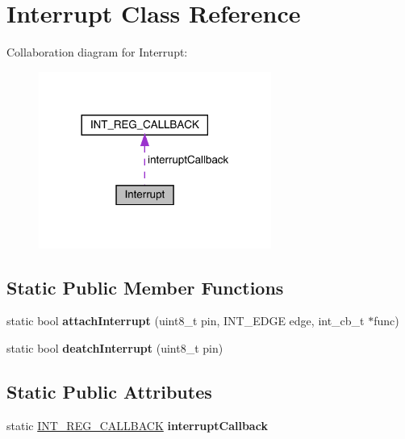 \hypertarget{classInterrupt}{}\section{Interrupt Class Reference}
\label{classInterrupt}


Collaboration diagram for Interrupt\+:\nopagebreak
\begin{figure}[H]
\begin{center}
\leavevmode
\includegraphics[width=216pt]{classInterrupt__coll__graph}
\end{center}
\end{figure}
\subsection*{Static Public Member Functions}
\begin{DoxyCompactItemize}
\item 
\mbox{\label{classInterrupt_a00ff3f6de1e03971a6883b7cb72577e4}} 
static bool {\bfseries attach\+Interrupt} (uint8\+\_\+t pin, I\+N\+T\+\_\+\+E\+D\+GE edge, int\+\_\+cb\+\_\+t $\ast$func)
\item 
\mbox{\label{classInterrupt_a3e17ff585a7271441a17f1d5a7a95a47}} 
static bool {\bfseries deatch\+Interrupt} (uint8\+\_\+t pin)
\end{DoxyCompactItemize}
\subsection*{Static Public Attributes}
\begin{DoxyCompactItemize}
\item 
\mbox{\label{classInterrupt_ad98c7ff1c3a116c56b7c67b630967413}} 
static \mbox{\hyperlink{structINT__REG__CALLBACK}{I\+N\+T\+\_\+\+R\+E\+G\+\_\+\+C\+A\+L\+L\+B\+A\+CK}} {\bfseries interrupt\+Callback}
\end{DoxyCompactItemize}
